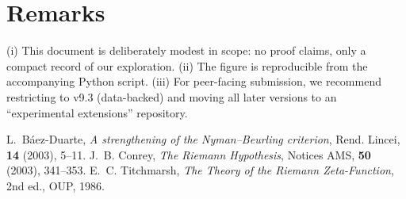 \documentclass[11pt]{article}
\theoremstyle{remark}
\begin{document}
\section{Remarks}
(i) This document is deliberately modest in scope: no proof claims, only a compact record of our exploration.
(ii) The figure is reproducible from the accompanying Python script.
(iii) For peer-facing submission, we recommend restricting to v9.3 (data-backed) and moving all later versions to an ``experimental extensions'' repository.

\begin{thebibliography}{9}
 L.~B\'aez-Duarte, \emph{A strengthening of the Nyman--Beurling criterion}, Rend. Lincei, \textbf{14} (2003), 5--11.
 J.~B. Conrey, \emph{The Riemann Hypothesis}, Notices AMS, \textbf{50} (2003), 341--353.
 E.~C. Titchmarsh, \emph{The Theory of the Riemann Zeta-Function}, 2nd ed., OUP, 1986.
\end{thebibliography}
\end{document}
